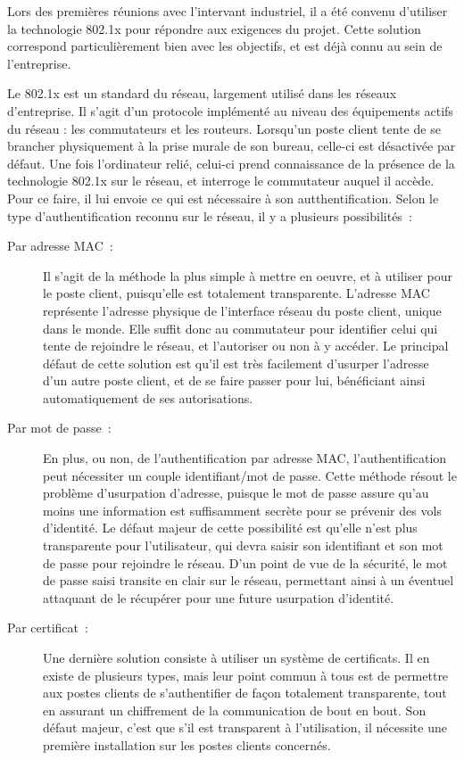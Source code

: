 Lors des premières réunions avec l'intervant industriel, il a été convenu d'utiliser la technologie 802.1x pour répondre aux exigences du projet. Cette solution correspond particulièrement bien avec les objectifs, et est déjà connu au sein de l'entreprise.

Le 802.1x est un standard du réseau, largement utilisé dans les réseaux d'entreprise. Il s'agit d'un protocole implémenté au niveau des équipements actifs du réseau : les commutateurs et les routeurs. Lorsqu'un poste client tente de se brancher physiquement à la prise murale de son bureau, celle-ci est désactivée par défaut. Une fois l'ordinateur relié, celui-ci prend connaissance de la présence de la technologie 802.1x sur le réseau, et interroge le commutateur auquel il accède. Pour ce faire, il lui envoie ce qui est nécessaire à son autthentification. Selon le type d'authentification reconnu sur le réseau, il y a plusieurs possibilités~:

\begin{description}
\item[Par adresse MAC~:] Il s'agit de la méthode la plus simple à mettre en oeuvre, et à utiliser pour le poste client, puisqu'elle est totalement transparente. L'adresse MAC représente l'adresse physique de l'interface réseau du poste client, unique dans le monde. Elle suffit donc au commutateur pour identifier celui qui tente de rejoindre le réseau, et l'autoriser ou non à y accéder. Le principal défaut de cette solution est qu'il est très facilement d'usurper l'adresse d'un autre poste client, et de se faire passer pour lui, bénéficiant ainsi automatiquement de ses autorisations.
\item[Par mot de passe~:] En plus, ou non, de l'authentification par adresse MAC, l'authentification peut nécessiter un couple identifiant/mot de passe. Cette méthode résout le problème d'usurpation d'adresse, puisque le mot de passe assure qu'au moins une information est suffisamment secrète pour se prévenir des vols d'identité. Le défaut majeur de cette possibilité est qu'elle n'est plus transparente pour l'utilisateur, qui devra saisir son identifiant et son mot de passe pour rejoindre le réseau. D'un point de vue de la sécurité, le mot de passe saisi transite en clair sur le réseau, permettant ainsi à un éventuel attaquant de le récupérer pour une future usurpation d'identité.
\item[Par certificat~:] Une dernière solution consiste à utiliser un système de certificats. Il en existe de plusieurs types, mais leur point commun à tous est de permettre aux postes clients de s'authentifier de façon totalement transparente, tout en assurant un chiffrement de la communication de bout en bout. Son défaut majeur, c'est que s'il est transparent à l'utilisation, il nécessite une première installation sur les postes clients concernés.
\end{description}

